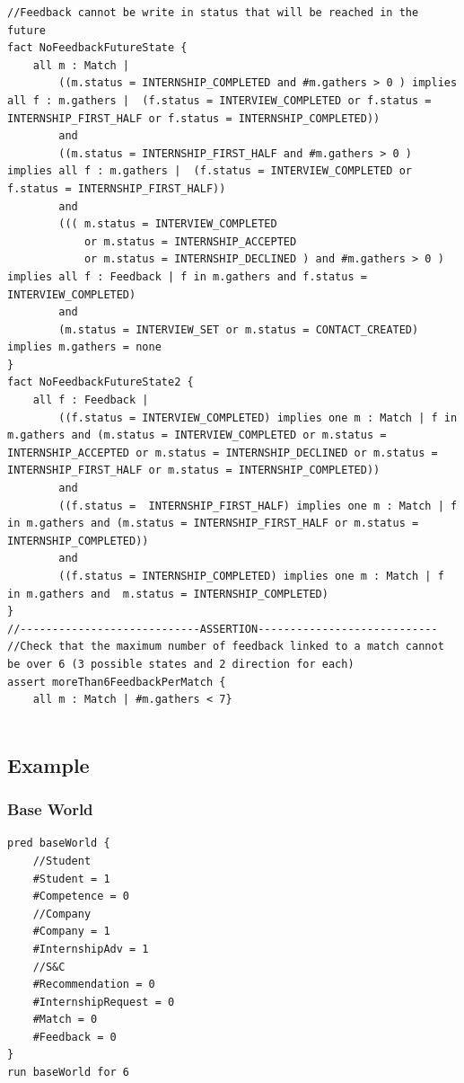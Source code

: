 \begin{lstlisting}
//Feedback cannot be write in status that will be reached in the future
fact NoFeedbackFutureState {
	all m : Match |
		((m.status = INTERNSHIP_COMPLETED and #m.gathers > 0 ) implies all f : m.gathers |  (f.status = INTERVIEW_COMPLETED or f.status = INTERNSHIP_FIRST_HALF or f.status = INTERNSHIP_COMPLETED))
		and
		((m.status = INTERNSHIP_FIRST_HALF and #m.gathers > 0 ) implies all f : m.gathers |  (f.status = INTERVIEW_COMPLETED or f.status = INTERNSHIP_FIRST_HALF))
		and
		(((	m.status = INTERVIEW_COMPLETED 
			or m.status = INTERNSHIP_ACCEPTED 
			or m.status = INTERNSHIP_DECLINED ) and #m.gathers > 0 ) implies all f : Feedback | f in m.gathers and f.status = INTERVIEW_COMPLETED)
		and
		(m.status = INTERVIEW_SET or m.status = CONTACT_CREATED) implies m.gathers = none
}
fact NoFeedbackFutureState2 {
	all f : Feedback |
		((f.status = INTERVIEW_COMPLETED) implies one m : Match | f in m.gathers and (m.status = INTERVIEW_COMPLETED or m.status = INTERNSHIP_ACCEPTED or m.status = INTERNSHIP_DECLINED or m.status = INTERNSHIP_FIRST_HALF or m.status = INTERNSHIP_COMPLETED))
		and
		((f.status =  INTERNSHIP_FIRST_HALF) implies one m : Match | f in m.gathers and (m.status = INTERNSHIP_FIRST_HALF or m.status = INTERNSHIP_COMPLETED))
		and
		((f.status = INTERNSHIP_COMPLETED) implies one m : Match | f in m.gathers and  m.status = INTERNSHIP_COMPLETED)
}
//----------------------------ASSERTION----------------------------
//Check that the maximum number of feedback linked to a match cannot be over 6 (3 possible states and 2 direction for each)
assert moreThan6FeedbackPerMatch {
	all m : Match | #m.gathers < 7}


\end{lstlisting}
\clearpage
\subsection{Example}

\subsubsection{Base World}
\begin{lstlisting}
pred baseWorld {
	//Student
	#Student = 1
	#Competence = 0
	//Company
	#Company = 1
	#InternshipAdv = 1
	//S&C
	#Recommendation = 0
	#InternshipRequest = 0
	#Match = 0
	#Feedback = 0
}
run baseWorld for 6
\end{lstlisting}

